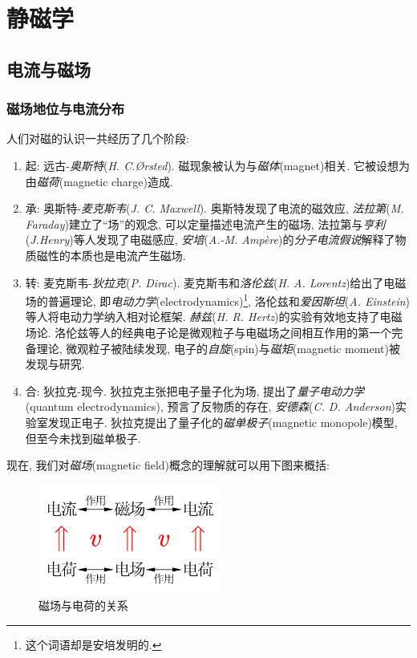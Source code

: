 \chapter{静磁学} 


\section{电流与磁场}

\subsection{磁场地位与电流分布}

人们对磁的认识一共经历了几个阶段:
\begin{enumerate}
\item 起: 远古-\emph{奥斯特}({\it H. C.\O rsted}). 磁现象被认为与\emph{磁体}(magnet)相关. 它被设想为由\emph{磁荷}(magnetic charge)造成.
\item 承: 奥斯特-\emph{麦克斯韦}({\it J. C. Maxwell}). 奥斯特发现了电流的磁效应, \emph{法拉第}({\it M. Faraday})建立了``场''的观念, 可以定量描述电流产生的磁场, 法拉第与\emph{亨利}({\it J.Henry})等人发现了电磁感应, \emph{安培}({\it A.-M. Amp\`ere})的\emph{分子电流假说}解释了物质磁性的本质也是电流产生磁场.
\item 转: 麦克斯韦-\emph{狄拉克}({\it P. Dirac}). 麦克斯韦和\emph{洛伦兹}({\it H. A. Lorentz})给出了电磁场的普遍理论, 即\emph{电动力学}(electrodynamics)\footnote{这个词语却是安培发明的.}, 洛伦兹和\emph{爱因斯坦}({\it A. Einstein})等人将电动力学纳入相对论框架. \emph{赫兹}({\it H. R. Hertz})的实验有效地支持了电磁场论. 洛伦兹等人的经典电子论是微观粒子与电磁场之间相互作用的第一个完备理论, 微观粒子被陆续发现, 电子的\emph{自旋}(spin)与\emph{磁矩}(magnetic moment)被发现与研究.
\item 合: 狄拉克-现今. 狄拉克主张把电子量子化为场, 提出了\emph{量子电动力学}(quantum electrodynamics), 预言了反物质的存在, \emph{安德森}({\it C. D. Anderson})实验室发现正电子. 狄拉克提出了量子化的\emph{磁单极子}(magnetic monopole)模型, 但至今未找到磁单极子.
\end{enumerate}

现在, 我们对\emph{磁场}(magnetic field)概念的理解就可以用下图来概括:

\begin{figure}
\centering
\vspace{-0.7cm}
\includegraphics[width=6cm]{image/7-4-3.png}
\caption{磁场与电荷的关系}

\end{figure}

